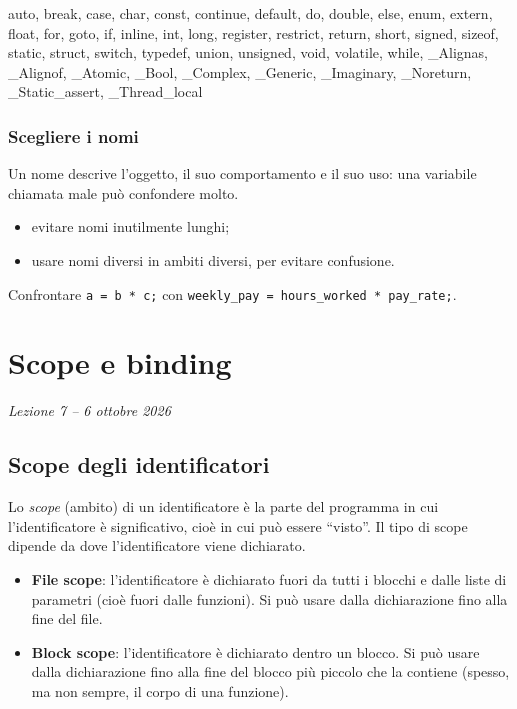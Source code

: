 \documentclass[11pt,a4paper]{article}
\begin{document}
\begin{center}
\begin{minipage}{0.9\textwidth}
\ttfamily\small
auto, break, case, char, const, continue, default, do, double, else, enum,
extern, float, for, goto, if, inline, int, long, register, restrict, return,
short, signed, sizeof, static, struct, switch, typedef, union, unsigned, void,
volatile, while, \_Alignas, \_Alignof, \_Atomic, \_Bool, \_Complex, \_Generic,
\_Imaginary, \_Noreturn, \_Static\_assert, \_Thread\_local
\end{minipage}
\end{center}

\subsubsection{Scegliere i nomi}

Un nome descrive l'oggetto, il suo comportamento e il suo uso: una variabile
chiamata male può confondere molto.
\begin{itemize}
    \item evitare nomi inutilmente lunghi;
    \item usare nomi diversi in ambiti diversi, per evitare confusione.
\end{itemize}

\begin{esempio}
Confrontare \lstinline|a = b * c;| con
\lstinline|weekly_pay = hours_worked * pay_rate;|.
\end{esempio}

\section[Scope e binding (Lezione 7 -- 6 ottobre 2026)]{Scope e binding}
\noindent\emph{Lezione 7 -- 6 ottobre 2026}
\subsection{Scope degli identificatori}

\begin{definizione}
Lo \emph{scope} (ambito) di un identificatore è la parte del programma in cui
l'identificatore è significativo, cioè in cui può essere ``visto''. Il tipo di
scope dipende da dove l'identificatore viene dichiarato.
\end{definizione}

\begin{itemize}
    \item \textbf{File scope}: l'identificatore è dichiarato fuori da tutti i
          blocchi e dalle liste di parametri (cioè fuori dalle funzioni). Si
          può usare dalla dichiarazione fino alla fine del file.
    \item \textbf{Block scope}: l'identificatore è dichiarato dentro un blocco.
          Si può usare dalla dichiarazione fino alla fine del blocco più piccolo
          che la contiene (spesso, ma non sempre, il corpo di una funzione).
\end{itemize}
\end{document}
